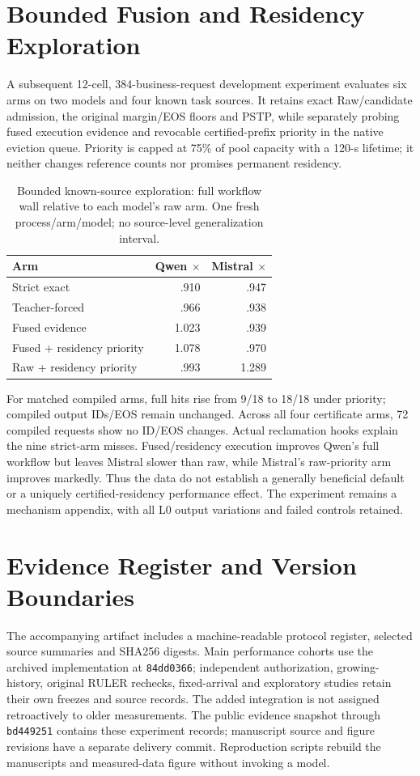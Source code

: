 \section{Bounded Fusion and Residency Exploration}
\label{sec:s-fusion-residency}
A subsequent 12-cell, 384-business-request development experiment evaluates six arms on two models and four known task sources. It retains exact Raw/candidate admission, the original margin/EOS floors and PSTP, while separately probing fused execution evidence and revocable certified-prefix priority in the native eviction queue. Priority is capped at 75\% of pool capacity with a 120-s lifetime; it neither changes reference counts nor promises permanent residency.

\begin{table}[t]
\centering\footnotesize
\caption{Bounded known-source exploration: full workflow wall relative to each model's raw arm. One fresh process/arm/model; no source-level generalization interval.}
\label{tab:s-fusion-residency}
\begin{tabular}{@{}lrr@{}}
\toprule
Arm & Qwen $\times$ & Mistral $\times$\\
\midrule
Strict exact & .910 & .947\\
Teacher-forced & .966 & .938\\
Fused evidence & 1.023 & .939\\
Fused + residency priority & 1.078 & .970\\
Raw + residency priority & .993 & 1.289\\
\bottomrule
\end{tabular}
\end{table}

For matched compiled arms, full hits rise from 9/18 to 18/18 under priority; compiled output IDs/EOS remain unchanged. Across all four certificate arms, 72 compiled requests show no ID/EOS changes. Actual reclamation hooks explain the nine strict-arm misses. Fused/residency execution improves Qwen's full workflow but leaves Mistral slower than raw, while Mistral's raw-priority arm improves markedly. Thus the data do not establish a generally beneficial default or a uniquely certified-residency performance effect. The experiment remains a mechanism appendix, with all L0 output variations and failed controls retained.

\section{Evidence Register and Version Boundaries}
\label{sec:s-evidence-register}
The accompanying artifact includes a machine-readable protocol register, selected source summaries and SHA256 digests. Main performance cohorts use the archived implementation at \texttt{84dd0366}; independent authorization, growing-history, original RULER rechecks, fixed-arrival and exploratory studies retain their own freezes and source records. The added integration is not assigned retroactively to older measurements. The public evidence snapshot through \texttt{bd449251} contains these experiment records; manuscript source and figure revisions have a separate delivery commit. Reproduction scripts rebuild the manuscripts and measured-data figure without invoking a model.
